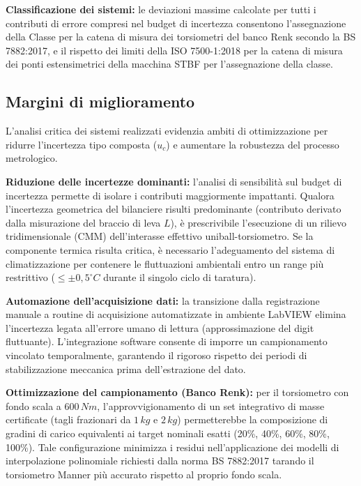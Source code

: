 \documentclass[a4paper, twoside]{article}
\begin{document}
\textbf{Classificazione dei sistemi:} le deviazioni massime calcolate per tutti i contributi di errore compresi nel budget di incertezza consentono l'assegnazione della Classe per la catena di misura dei torsiometri del banco Renk secondo la BS 7882:2017, e il rispetto dei limiti della ISO 7500-1:2018 per la catena di misura dei ponti estensimetrici della macchina STBF per l'assegnazione della classe.

\subsection{Margini di miglioramento}

L'analisi critica dei sistemi realizzati evidenzia ambiti di ottimizzazione per ridurre l'incertezza tipo composta ($u_c$) e aumentare la robustezza del processo metrologico.

\textbf{Riduzione delle incertezze dominanti:} l'analisi di sensibilità sul budget di incertezza permette di isolare i contributi maggiormente impattanti. Qualora l'incertezza geometrica del bilanciere risulti predominante (contributo derivato dalla misurazione del braccio di leva $L$), è prescrivibile l'esecuzione di un rilievo tridimensionale (CMM) dell'interasse effettivo uniball-torsiometro. Se la componente termica risulta critica, è necessario l'adeguamento del sistema di climatizzazione per contenere le fluttuazioni ambientali entro un range più restrittivo ($\le \pm 0,5^\circ C$ durante il singolo ciclo di taratura).

\textbf{Automazione dell'acquisizione dati:} la transizione dalla registrazione manuale a routine di acquisizione automatizzate in ambiente LabVIEW elimina l'incertezza legata all'errore umano di lettura (approssimazione del digit fluttuante). L'integrazione software consente di imporre un campionamento vincolato temporalmente, garantendo il rigoroso rispetto dei periodi di stabilizzazione meccanica prima dell'estrazione del dato.

\textbf{Ottimizzazione del campionamento (Banco Renk):} per il torsiometro con fondo scala a $600\,Nm$, l'approvvigionamento di un set integrativo di masse certificate (tagli frazionari da $1\,kg$ e $2\,kg$) permetterebbe la composizione di gradini di carico equivalenti ai target nominali esatti (20\%, 40\%, 60\%, 80\%, 100\%). Tale configurazione minimizza i residui nell'applicazione dei modelli di interpolazione polinomiale richiesti dalla norma BS 7882:2017 tarando il torsiometro Manner più accurato rispetto al proprio fondo scala.
\end{document}
